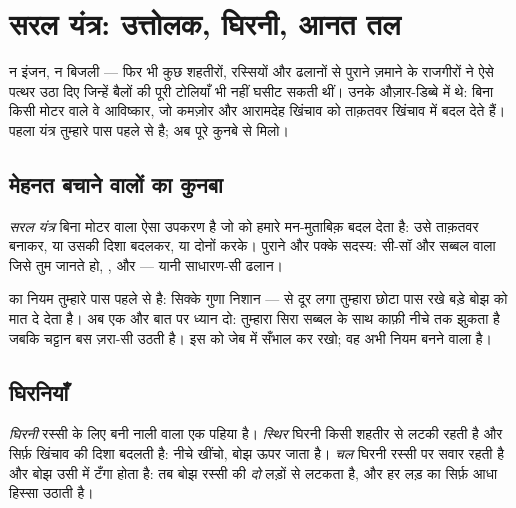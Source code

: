 \chapter{सरल यंत्र: उत्तोलक, घिरनी, आनत तल}\label{ch:g5:simple-machines}

न इंजन, न बिजली --- फिर भी कुछ शहतीरों, रस्सियों और ढलानों से पुराने
ज़माने के राजगीरों ने ऐसे पत्थर उठा दिए जिन्हें बैलों की पूरी टोलियाँ
भी नहीं घसीट सकती थीं। उनके औज़ार-डिब्बे में \emph{} थे:
बिना किसी मोटर वाले वे आविष्कार, जो कमज़ोर और आरामदेह खिंचाव को ताक़तवर
खिंचाव में बदल देते हैं। पहला यंत्र तुम्हारे पास पहले से है; अब पूरे
कुनबे से मिलो।

\section{मेहनत बचाने वालों का कुनबा}

\begin{definition}[सरल यंत्र]\label{def:g5:simple-machines:machine}
\emph{सरल यंत्र} बिना मोटर वाला ऐसा उपकरण है जो 
को हमारे मन-मुताबिक़ बदल देता है: उसे ताक़तवर बनाकर, या उसकी दिशा
बदलकर, या दोनों करके। पुराने और पक्के सदस्य: सी-सॉ और सब्बल वाला
\emph{} जिसे तुम जानते हो, \emph{}, और
\emph{} --- यानी साधारण-सी ढलान।
\end{definition}

\begin{example}[उत्तोलक, फिर से]\label{ex:g5:simple-machines:lever}
 का नियम तुम्हारे पास पहले से है: सिक्के गुणा निशान --- 
से दूर लगा तुम्हारा छोटा  पास रखे बड़े बोझ को मात दे देता है। अब एक
और बात पर ध्यान दो: तुम्हारा सिरा सब्बल के साथ काफ़ी नीचे तक झुकता है
जबकि चट्टान बस ज़रा-सी उठती है। इस  को जेब में सँभाल कर रखो;
वह अभी नियम बनने वाला है।
\end{example}

\section{घिरनियाँ}

\begin{definition}[घिरनी]\label{def:g5:simple-machines:pulley}
\emph{घिरनी} रस्सी के लिए बनी नाली वाला एक पहिया है।
\emph{स्थिर} घिरनी किसी शहतीर से लटकी रहती है और सिर्फ़ खिंचाव की
दिशा बदलती है: नीचे खींचो, बोझ ऊपर जाता है। \emph{चल} घिरनी रस्सी पर
सवार रहती है और बोझ उसी में टँगा होता है: तब बोझ रस्सी की \emph{दो}
लड़ों से लटकता है, और हर लड़  का सिर्फ़ आधा हिस्सा उठाती है।
\end{definition}

